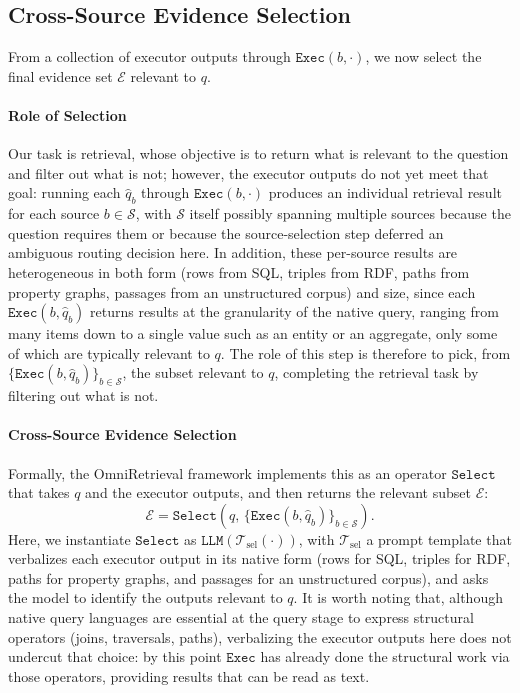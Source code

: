 \subsection{Cross-Source Evidence Selection}

From a collection of executor outputs through $\texttt{Exec}(b, \cdot)$, we now select the final evidence set $\mathcal{E}$ relevant to $q$.

\paragraph{Role of Selection}
Our task is retrieval, whose objective is to return what is relevant to the question and filter out what is not; however, the executor outputs do not yet meet that goal: running each $\hat{q}_b$ through $\texttt{Exec}(b, \cdot)$ produces an individual retrieval result for each source $b \in \mathcal{S}$, with $\mathcal{S}$ itself possibly spanning multiple sources because the question requires them or because the source-selection step deferred an ambiguous routing decision here. In addition, these per-source results are heterogeneous in both form (rows from SQL, triples from RDF, paths from property graphs, passages from an unstructured corpus) and size, since each $\texttt{Exec}(b, \hat{q}_b)$ returns results at the granularity of the native query, ranging from many items down to a single value such as an entity or an aggregate, only some of which are typically relevant to $q$. The role of this step is therefore to pick, from $\{\texttt{Exec}(b, \hat{q}_b)\}_{b \in \mathcal{S}}$, the subset relevant to $q$, completing the retrieval task by filtering out what is not.

\paragraph{Cross-Source Evidence Selection}
Formally, the OmniRetrieval framework implements this as an operator $\texttt{Select}$ that takes $q$ and the executor outputs, and then returns the relevant subset $\mathcal{E}$:
\begin{equation}
\mathcal{E} = \texttt{Select}(q,\, \{\texttt{Exec}(b, \hat{q}_b)\}_{b \in \mathcal{S}}).
\end{equation}
Here, we instantiate $\texttt{Select}$ as $\texttt{LLM}(\mathcal{T}_{\text{sel}}(\cdot))$, with $\mathcal{T}_{\text{sel}}$ a prompt template that verbalizes each executor output in its native form (rows for SQL, triples for RDF, paths for property graphs, and passages for an unstructured corpus), and asks the model to identify the outputs relevant to $q$. It is worth noting that, although native query languages are essential at the query stage to express structural operators (joins, traversals, paths), verbalizing the executor outputs here does not undercut that choice: by this point $\texttt{Exec}$ has already done the structural work via those operators, providing results that can be read as text.

